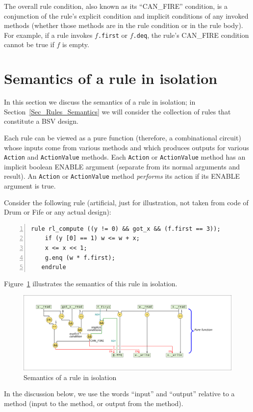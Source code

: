 The overall rule condition, also known as its ``CAN\_FIRE'' condition,
is a conjunction of the rule's explicit condition and implicit
conditions of any invoked methods (whether those methods are in the
rule condition or in the rule body).  For example, if a rule invokes
$f$\verb|.first| or $f$\verb|.deq|, the rule's CAN\_FIRE condition
cannot be true if $f$ is empty.


\section{Semantics of a rule in isolation}

\label{Sec_Single_Rule_Semantics}


In this section we discuss the semantics of a rule in isolation; in
Section~\ref{Sec_Rules_Semantics} we will consider the collection of
rules that constitute a BSV design.

Each rule can be viewed as a pure function (therefore, a combinational
circuit) whose inputs come from various methods and which produces
outputs for various \verb|Action| and \verb|ActionValue| methods.
Each \verb|Action| or \verb|ActionValue| method has an implicit
boolean ENABLE argument (separate from its normal arguments and
result).  An \verb|Action| or \verb|ActionValue| method
\emph{performs} its action if its ENABLE argument is true.

Consider the following rule (artificial, just for illustration, not
taken from code of Drum or Fife or any actual design):

{\footnotesize
\begin{Verbatim}[frame=single, numbers=left]
   rule rl_compute ((y != 0) && got_x && (f.first == 3));
    if (y [0] == 1) w <= w + x;
    x <= x << 1;
    g.enq (w * f.first);
   endrule
\end{Verbatim}
}

Figure~\ref{Fig_Rule_Actions_1} illustrates the semantics of this rule
in isolation.
\begin{figure}[htbp]
  \centerline{\includegraphics[width=6in,angle=0]{Figures/Fig_Rule_Actions_1}}
  \caption{\label{Fig_Rule_Actions_1} Semantics of a rule in isolation}
\end{figure}
In the discussion below, we use the words ``input'' and ``output''
relative to a method (input to the method, or output from the method).

